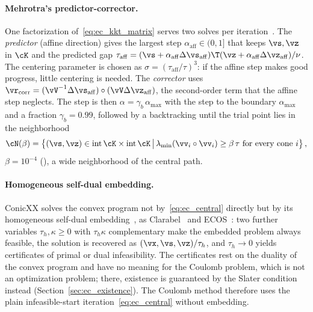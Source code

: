 \paragraph{Mehrotra's predictor-corrector.} One factorization of~\eqref{eq:ec_kkt_matrix} serves two solves per iteration~\cite{Mehrotra1992}. The \emph{predictor} (affine direction) gives the largest step $\alpha_{\mathrm{aff}} \in (0, 1]$ that keeps $\vs, \vz$ in $\cK$ and the predicted gap $\tau_{\mathrm{aff}} = (\vs + \alpha_{\mathrm{aff}}\Delta\vs_{\mathrm{aff}})\T(\vz + \alpha_{\mathrm{aff}}\Delta\vz_{\mathrm{aff}})/\nu$. The centering parameter is chosen as $\sigma = (\tau_{\mathrm{aff}}/\tau)^3$: if the affine step makes good progress, little centering is needed. The \emph{corrector} uses $\vr_{\mathrm{corr}} = (\vV^{-1}\Delta\vs_{\mathrm{aff}})\circ(\vV\Delta\vz_{\mathrm{aff}})$, the second-order term that the affine step neglects. The step is then $\alpha = \gamma_b\,\alpha_{\max}$ with the step to the boundary $\alpha_{\max}$ and a fraction $\gamma_b = 0.99$, followed by a backtracking until the trial point lies in the neighborhood
%
\begin{equation}\label{eq:ec_neighborhood}
	\cN(\beta) = \big\{(\vs, \vz) \in \operatorname{int}\cK \times \operatorname{int}\cK \, \big| \, \lambda_{\min}(\vv_i\circ\vv_i) \geq \beta\,\tau \text{ for every cone } i\big\} \, ,
\end{equation}
%
$\beta = 10^{-4}$ (), a wide neighborhood of the central path.
%
\paragraph{Homogeneous self-dual embedding.} ConicXX solves the convex program not by~\eqref{eq:ec_central} directly but by its homogeneous self-dual embedding~\cite{Ye1994}, as Clarabel~\cite{Goulart2024} and ECOS~\cite{Domahidi2013}: two further variables $\tau_h, \kappa \geq 0$ with $\tau_h\kappa$ complementary make the embedded problem always feasible, the solution is recovered as $(\vx, \vs, \vz)/\tau_h$, and $\tau_h \to 0$ yields certificates of primal or dual infeasibility. The certificates rest on the duality of the convex program and have no meaning for the Coulomb problem, which is not an optimization problem; there, existence is guaranteed by the Slater condition instead (Section~\ref{sec:ec_existence}). The Coulomb method therefore uses the plain infeasible-start iteration~\eqref{eq:ec_central} without embedding.
%
